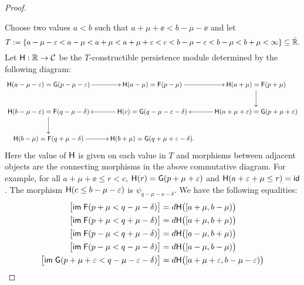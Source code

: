 \documentclass[12pt]{article}
\begin{document}
\begin{proof}
\begin{center}
\end{center}
Choose two values $a < b$ such that $a+ \mu+\ee < b-\mu-\ee$ and let
$$T := \{ a-\mu-\varepsilon < a-\mu < a+\mu < a+\mu+\varepsilon < c < b-\mu-\varepsilon < b-\mu < b+\mu < \infty \} 
\subseteq \bar {{\mathbb R}}.$$
Let ${\mathsf{H}}: {\mathbb R} \to \mathcal{C}$ be the $T$-constructible persistence module determined by the following diagram:
\begin{equation*}
\xymatrix{
\Hfunc(a-\mu-\ee) = \Gfunc(p-\mu-\ee) \ar[r] & \Hfunc(a-\mu) = \Ffunc(p-\mu) \ar[r] & 
\Hfunc(a+\mu) = \Ffunc(p+\mu) \ar[d] \\
\Hfunc(b-\mu-\ee) = \Ffunc(q-\mu-\delta) \ar[d] & \Hfunc(c) = \Gfunc (q-\mu-\ee-\delta) \ar[l] &  
\Hfunc(a+\mu+\ee) = \Gfunc(p+\mu+\ee) \ar[l] \\
\Hfunc(b-\mu) = \Ffunc(q+\mu-\delta) \ar[r] & \Hfunc(b+\mu) = \Gfunc(q+\mu+\ee-\delta).
}
\end{equation*}
Here the value of ${\mathsf{H}}$ is given on each value in $T$ and morphisms between adjacent objects are the connecting
morphisms in the above commutative diagram.
For example, for all $a+\mu+\ee \leq r < c$, ${\mathsf{H}}(r) = {\mathsf{G}}(p+\mu+\varepsilon)$ and 
${\mathsf{H}}(a+\varepsilon+\mu \leq r) = \mathsf{id}$.
The morphism ${\mathsf{H}}(c \leq b-\mu-\varepsilon)$ is $\psi_{q-\mu-\ee-\delta}$.
We have the following equalities:
\begin{align*}
\big[ \image\; \Ffunc ( p + \mu < q-\mu-\delta) \big] &= d \Hfunc \big( [a+\mu, b-\mu) \big) \\
\big[ \image\; \Ffunc ( p + \mu < q+\mu-\delta) \big] &= d \Hfunc \big( [a+\mu, b+\mu) \big)  \\
\big[ \image\; \Ffunc ( p - \mu < q+\mu-\delta) \big] &= d \Hfunc \big( [a-\mu, b+\mu) \big) \\
\big[ \image\; \Ffunc ( p - \mu < q-\mu-\delta) \big] &= d \Hfunc \big( [a-\mu, b-\mu) \big) \\
\big[ \image\; \Gfunc ( p+\mu+\ee < q-\mu-\ee-\delta) \big] &= d \Hfunc \big( [a+\mu+\ee, b-\mu-\ee) \big) \\ 

\end{align*}
\end{proof}
\end{document}
